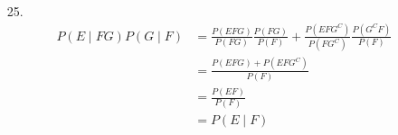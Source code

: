 \documentclass{article}
\begin{document}
\begin{itemize}
\begin{proof}
\begin{proof}
      \begin{equation*}
        \begin{split}
          P(E_i \cup E_j) \cdot P(E_k)
          &= P(E_i)P(E_k)  + P(E_j)P(E_k) - P(E_iE_j)P(E_k)\\
          &= P(E_i)P(E_k)  + P(E_j)P(E_k) - P(E_i)P(E_j)P(E_k) \\
          &= P(E_i)P(E_k)  + P(E_j)P(E_k) - P((E_iE_k) (E_jE_k))\\
          &= P((E_iE_k) \cup (E_jE_k))\\
          &= P((E_i \cup E_j)E_k)
        \end{split}
      \end{equation*}
      Therefore, $S$ is indeed pairwise independent with the elements
      in $E_i$.
    \end{proof}


    Suppose the equation holds for some \(n \geq 1\).
    \begin{equation*}
      \begin{split}
        P(\bigcup_{i=1}^{n+1}E_i) &= P((\bigcup_{i=1}^nE_i) \cup
        E_{n+1})\\
        &= P(\bigcup_{i=1}^{n}E_i) + P(E_{n+1}) -
        P(\bigcup_{i=1}^{n}E_i) \cdot P(E_{n+1})\\
        &= 1 - \prod_{i=1}^n (1-(P(E_i))) + P(E_{n+1}) -
        (1-\prod_{i=1}^n(1-P(E_i)))P(E_{n+1})\\
        &= 1 - (\prod_{i=1}^n(1-P(E_i)))(1-P(E_{n+1}))\\
        & = 1 - \prod_{i=1}^{n+1} (1-P(E_i))
      \end{split}
    \end{equation*}
    
  \end{proof}
\item [25.]
  \begin{equation*}
    \begin{split}
      P(E \mid FG) P(G \mid F) 
      &= \frac{P(EFG)}{P(FG)} \frac{P(FG)}{P(F)} +
      \frac{P(EFG^C)}{P(FG^C)}\frac{P(G^CF)}{P(F)}\\
      &= \frac{P(EFG)+P(EFG^C)}{P(F)}\\
      &= \frac{P(EF)}{P(F)}\\
      &= P(E\mid F)
    \end{split}
  \end{equation*}
\end{itemize}
\end{document}
